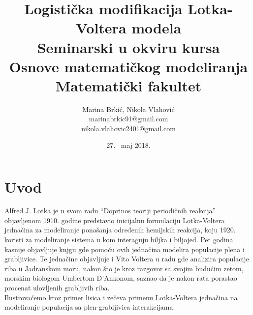\documentclass[a4paper]{article}
\begin{document}
\title{Logistička modifikacija Lotka-Voltera modela\\
	\small{Seminarski u okviru kursa\\Osnove matematičkog modeliranja\\Matematički fakultet}
}
\author{Marina Brkić, Nikola Vlahović\\marinabrkic91@gmail.com\\nikola.vlahovic2401@gmail.com}
\date{27. ~maj 2018.}
\maketitle
{}
\tableofcontents

\newpage

\section{Uvod}
\label{sec:uvod}

Alfred J. Lotka je u svom radu ``Doprinos teoriji periodičnih reakcija'' objavljenom 1910. godine predstavio
inicijalnu formulaciju Lotka-Voltera jednačina za modeliranje ponašanja određenih hemijskih reakcija, koju
1920. koristi za modeliranje sistema u kom interaguju biljka i biljojed. Pet godina kasnije objavljuje knjgu
gde pomoću ovih jednačina modelira populacije plena i grabljivice. Te jednačine objavljuje i Vito Voltera
u radu gde analizira populacije riba u Jadranskom moru, nakon što je kroz razgovor sa svojim budućim zetom,
morskim biologom Umbertom D'Ankonom, saznao da je nakon rata porastao procenat ulovljenih grabljivih riba.
\\

Ilustrovaćemo kroz primer lisica i zečeva primenu Lotka-Voltera jednačina na modeliranje
populacija sa plen-grabljivica interakcijama.
\end{document}
